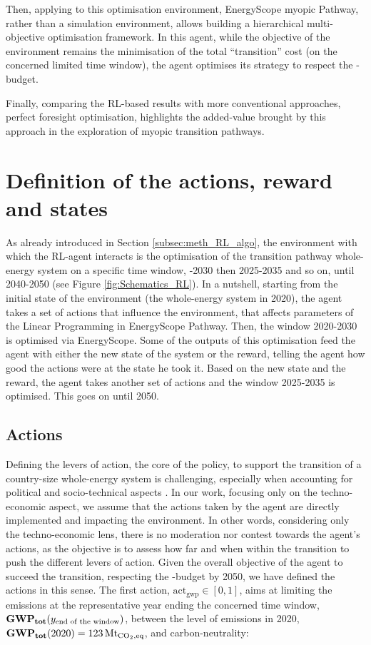 Then, applying to this optimisation environment, \ie EnergyScope myopic Pathway,  rather than a simulation environment, allows building a hierarchical multi-objective optimisation framework. In this agent, while the objective of the environment remains the minimisation of the total ``transition'' cost (on the concerned limited time window), the agent optimises its strategy to respect the -budget. 

Finally, comparing the \gls{RL}-based results with more conventional approaches, \ie perfect foresight optimisation, highlights the added-value brought by this approach in the exploration of myopic transition pathways.


\section{Definition of the actions, reward and states}
\label{sec:RL:act_states_rew}
As already introduced in Section \ref{subsec:meth_RL_algo}, the environment with which the \gls{RL}-agent interacts is the optimisation of the transition pathway whole-energy system on a specific time window, -2030 then 2025-2035 and so on, until 2040-2050 (see Figure \ref{fig:Schematics_RL}). In a nutshell, starting from the initial state of the environment (\ie the whole-energy system in 2020), the agent takes a set of actions that influence the environment, \ie that affects parameters of the Linear Programming in EnergyScope Pathway. Then, the window 2020-2030 is optimised via EnergyScope. Some of the outputs of this optimisation feed the agent with either the new state of the system or the reward, \ie telling the agent how good the actions were at the state he took it. Based on the new state and the reward, the agent takes another set of actions and the window 2025-2035 is optimised. This goes on until 2050.

\subsection{Actions}
\label{subsec:RL:act_states_rew:act}

Defining the levers of action, the core of the policy, to support the transition of a country-size whole-energy system is challenging, especially when accounting for political and socio-technical aspects \cite{castrejon2020making}. In our work, focusing only on the techno-economic aspect, we assume that the actions taken by the agent are directly implemented and impacting the environment. In other words, considering only the techno-economic lens, there is no moderation nor contest towards the agent's actions, as the objective is to assess how far and when within the transition to push the different levers of action. Given the overall objective of the agent to succeed the transition, \ie respecting the -budget by 2050, we have defined the actions in this sense. The first action, $\mathrm{act}_{\mathrm{gwp}} \in [0,1]$, aims at limiting the emissions at the representative year ending the concerned time window, $\textbf{GWP\textsubscript{tot}}(y_{\text{end of the window}})$, between the level of emissions in 2020, \ie $\textbf{GWP\textsubscript{tot}}(2020)=123\,\text{Mt}_{\ce{CO2},\text{eq}}$, and carbon-neutrality:

